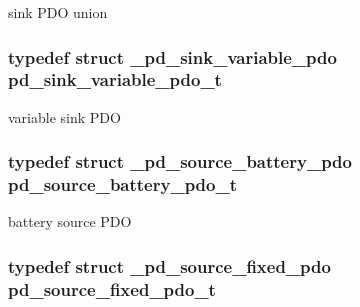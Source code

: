 sink P\-D\-O union 

\hypertarget{group__usb__pd__stack_gaf18073722dd91e4b87b60a6db76dc8dc}{
\subsubsection[{pd\-\_\-sink\-\_\-variable\-\_\-pdo\-\_\-t}]{\setlength{\rightskip}{0pt plus 5cm}typedef struct {\bf \-\_\-pd\-\_\-sink\-\_\-variable\-\_\-pdo}  {\bf pd\-\_\-sink\-\_\-variable\-\_\-pdo\-\_\-t}}}\label{group__usb__pd__stack_gaf18073722dd91e4b87b60a6db76dc8dc}


variable sink P\-D\-O 

\hypertarget{group__usb__pd__stack_ga5f2a906851b2fe0554a083085c62324b}{
\subsubsection[{pd\-\_\-source\-\_\-battery\-\_\-pdo\-\_\-t}]{\setlength{\rightskip}{0pt plus 5cm}typedef struct {\bf \-\_\-pd\-\_\-source\-\_\-battery\-\_\-pdo}  {\bf pd\-\_\-source\-\_\-battery\-\_\-pdo\-\_\-t}}}\label{group__usb__pd__stack_ga5f2a906851b2fe0554a083085c62324b}


battery source P\-D\-O 

\hypertarget{group__usb__pd__stack_gaa7dd48248cb5b3177c59635a91f1b16e}{
\subsubsection[{pd\-\_\-source\-\_\-fixed\-\_\-pdo\-\_\-t}]{\setlength{\rightskip}{0pt plus 5cm}typedef struct {\bf \-\_\-pd\-\_\-source\-\_\-fixed\-\_\-pdo}  {\bf pd\-\_\-source\-\_\-fixed\-\_\-pdo\-\_\-t}}}\label{group__usb__pd__stack_gaa7dd48248cb5b3177c59635a91f1b16e}


